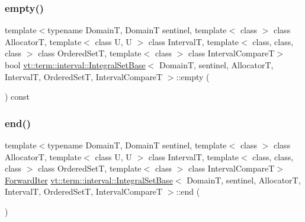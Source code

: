 \subsubsection{\texorpdfstring{empty()}{empty()}}
{\footnotesize\ttfamily template$<$typename DomainT, DomainT sentinel, template$<$ class $>$ class AllocatorT, template$<$ class U, U $>$ class IntervalT, template$<$ class, class, class $>$ class Ordered\+SetT, template$<$ class $>$ class Interval\+CompareT$>$ \\
bool \hyperlink{structvt_1_1term_1_1interval_1_1_integral_set_base}{vt\+::term\+::interval\+::\+Integral\+Set\+Base}$<$ DomainT, sentinel, AllocatorT, IntervalT, Ordered\+SetT, Interval\+CompareT $>$\+::empty (\begin{DoxyParamCaption}{ }\end{DoxyParamCaption}) const\hspace{0.3cm}{\ttfamily [inline]}}

\mbox{\label{structvt_1_1term_1_1interval_1_1_integral_set_base_aaec7a0f928c035753685be34d0cc54f8}} 
\subsubsection{\texorpdfstring{end()}{end()}}
{\footnotesize\ttfamily template$<$typename DomainT, DomainT sentinel, template$<$ class $>$ class AllocatorT, template$<$ class U, U $>$ class IntervalT, template$<$ class, class, class $>$ class Ordered\+SetT, template$<$ class $>$ class Interval\+CompareT$>$ \\
\hyperlink{structvt_1_1term_1_1interval_1_1_integral_set_base_abd0d7f40a96384d2db0a2782a8921a34}{Forward\+Iter} \hyperlink{structvt_1_1term_1_1interval_1_1_integral_set_base}{vt\+::term\+::interval\+::\+Integral\+Set\+Base}$<$ DomainT, sentinel, AllocatorT, IntervalT, Ordered\+SetT, Interval\+CompareT $>$\+::end (\begin{DoxyParamCaption}{ }\end{DoxyParamCaption})\hspace{0.3cm}{\ttfamily [inline]}}

\mbox{\label{structvt_1_1term_1_1interval_1_1_integral_set_base_a26d04c73487d5911c447e627dae87627}} 
